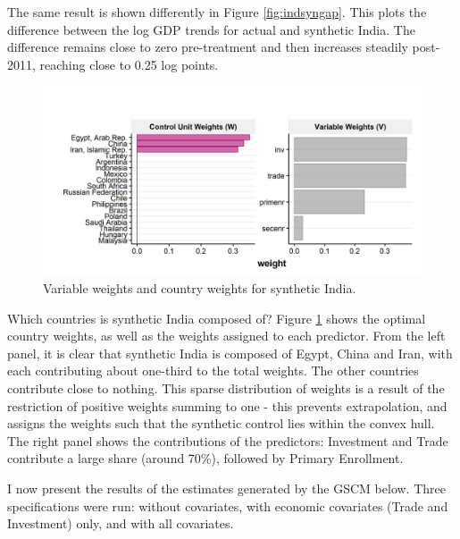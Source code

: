 \documentclass[12pt,nobind, a4paper]{reedthesis}
\begin{document}
 The same result is shown differently in Figure \ref{fig:indsyngap}. This plots the difference between the log GDP trends for actual and synthetic India. The difference remains close to zero pre-treatment and then increases steadily post-2011, reaching close to 0.25 log points.
 \begin{figure}

 {\centering \includegraphics[width=1\linewidth]{figure/weights} 

 }

 \caption{Variable weights and country weights for synthetic India.}\label{fig:weights}
 \end{figure}
 Which countries is synthetic India composed of? Figure \ref{fig:weights} shows the optimal country weights, as well as the weights assigned to each predictor. From the left panel, it is clear that synthetic India is composed of Egypt, China and Iran, with each contributing about one-third to the total weights. The other countries contribute close to nothing. This sparse distribution of weights is a result of the restriction of positive weights summing to one - this prevents extrapolation, and assigns the weights such that the synthetic control lies within the convex hull. The right panel shows the contributions of the predictors: Investment and Trade contribute a large share (around 70\%), followed by Primary Enrollment.
 \linebreak

 I now present the results of the estimates generated by the GSCM below. Three specifications were run: without covariates, with economic covariates (Trade and Investment) only, and with all covariates.
\end{document}

